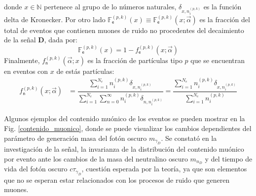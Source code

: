 donde $x\in\mathbb{N}$ pertenece al grupo de lo números naturales, $\delta_{x,n_i^{(p,k)}}$ es la función delta de Kronecker. Por otro lado $\mathbb{F}^{(p, k)}_\textsf{e} (x)\equiv \mathbb{F}^{(p, k)}_\textsf{e} (x; \vec{\alpha})$ es la fracción del total de eventos que contienen muones de ruido no procedentes del decaimiento de la señal \MSSM\textbf{D}, dada por:
\begin{equation}\label{fnInverso}
\mathbb{F}^{(p, k)}_\textsf{e} (x)= 1 - f^{(p, k)}_\textsf{e}  (x; \vec{\alpha})
\end{equation}
Finalmente, $f^{(p, k)}_\textsf{n} (\vec{\alpha}; x)$ es la fracción de partículas tipo $p$ que se encuentran en eventos con $x$ de estás partículas:
\begin{eqnarray}\label{fn}
f^{(p, k)}_\textsf{n} (x; \vec{\alpha}) & = \dfrac{\sum\limits_{i=1}^{N_e} n_i^{(p,k)} \delta_{x,n_i^{(p,k)}}}{\sum\limits_{i=1}^{N_e} \sum\limits_{n=0}^\infty n_i^{(p,k)} \delta_{n, n_i^{(p,k)}}}  = \dfrac{\sum\limits_{i=1}^{N_e} n_i^{(p,k)} \delta_{x, n_i^{(p,k)}}}{\sum\limits_{i=1}^{N_e} n_i^{(p,k)}}
\end{eqnarray}


Algunos ejemplos del contenido muónico de los eventos se pueden mostrar en la Fig. \ref{contenido_muonico}, donde se puede visualizar los cambios dependientes del parámetro de generación masa del fotón oscuro $m_{\gamma_D}$. Se constató en la investigación de la señal, la invarianza de la distribución del contenido muónico por evento ante los cambios de la masa del neutralino oscuro $m_{n_D}$ y del tiempo de vida del fotón oscuro $c \tau_{\gamma_D}$, cuestión esperada por la teoría, ya que son elementos que no se esperan estar relacionados con los procesos de ruido que generen muones.

